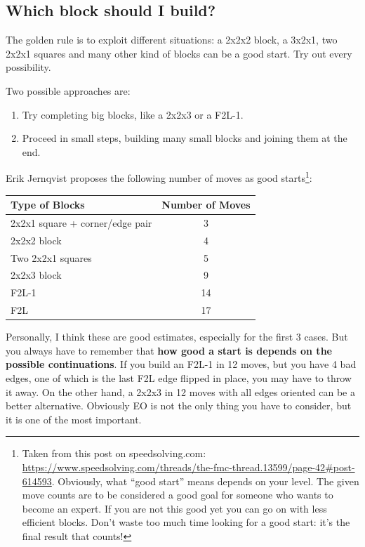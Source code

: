 \documentclass[11pt,a4paper]{book}
\begin{document}
\subsection{Which block should I build?}

The golden rule is to exploit different situations: a 2x2x2 block, a 3x2x1, two 2x2x1 squares and many other kind of blocks can be a good start. Try out every possibility.

Two possible approaches are:
\begin{enumerate}
\item Try completing big blocks, like a 2x2x3 or a F2L-1.
\item Proceed in small steps, building many small blocks and joining them at the end.
\end{enumerate}

Erik Jernqvist proposes the following number of moves as good starts\footnote{Taken from this post on speedsolving.com: \url{https://www.speedsolving.com/threads/the-fmc-thread.13599/page-42\#post-614593}. Obviously, what ``good start'' means depends on your level. The given move counts are to be considered a good goal for someone who wants to become an expert. If you are not this good yet you can go on with less efficient blocks. Don't waste too much time looking for a good start: it's the final result that counts!}:

\bigskip
\begin{center}
\begin{tabular}{|l|c|}
\hline
Type of Blocks & Number of Moves\\
\hline
2x2x1 square + corner/edge pair & 3\\
\hline
2x2x2 block & 4\\
\hline
Two 2x2x1 squares & 5\\
\hline
2x2x3 block & 9\\
\hline
F2L-1 & 14\\
\hline
F2L & 17\\
\hline
\end{tabular}
\end{center}

Personally, I think these are good estimates, especially for the first 3 cases. But you always have to remember that \textbf{how good a start is depends on the possible continuations}. If you build an F2L-1 in 12 moves, but you have 4 bad edges, one of which is the last F2L edge flipped in place, you may have to throw it away. On the other hand, a 2x2x3 in 12 moves with all edges oriented can be a better alternative. Obviously EO is not the only thing you have to consider, but it is one of the most important.
\end{document}
